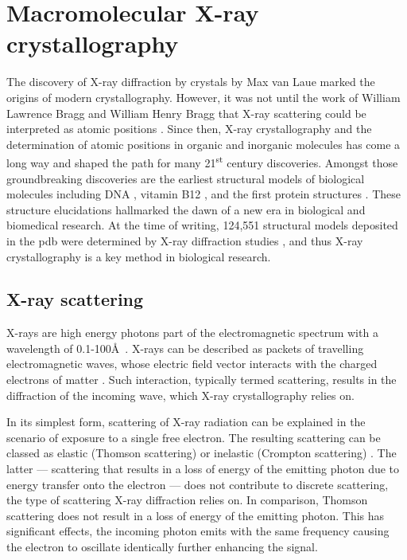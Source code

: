 
%
%

\section{Macromolecular X-ray crystallography}
The discovery of X-ray diffraction by crystals by Max van Laue \cite{Friedrich1913-vx,Laue1913-sn} marked the origins of modern crystallography. However, it was not until the work of William Lawrence Bragg and William Henry Bragg that X-ray scattering could be interpreted as atomic positions \cite{Bragg1913-cx,Bragg1929-xp,Bragg1912-ht}. Since then, X-ray crystallography and the determination of atomic positions in organic and inorganic molecules has come a long way and shaped the path for many 21\textsuperscript{st} century discoveries. Amongst those groundbreaking discoveries are the earliest structural models of biological molecules including DNA \cite{Watson1953-qw}, vitamin B12 \cite{Hodgkin1956-mx}, and the first protein structures \cite{Blundell1971-mv,Blake1965-ng,Perutz1960-qz,Kendrew1958-on}. These structure elucidations hallmarked the dawn of a new era in biological and biomedical research. At the time of writing, 124,551 structural models deposited in the \gls{pdb} were determined by X-ray diffraction studies \cite{Berman2000-ua}, and thus X-ray crystallography is a key method in biological research.

\subsection{X-ray scattering}
X-rays are high energy photons part of the electromagnetic spectrum with a wavelength of 0.1-100\AA\ \cite{Rupp2010-nc}. X-rays can be described as packets of travelling electromagnetic waves, whose electric field vector interacts with the charged electrons of matter \cite{Rupp2010-nc}. Such interaction, typically termed scattering, results in the diffraction of the incoming wave, which X-ray crystallography relies on.

In its simplest form, scattering of X-ray radiation can be explained in the scenario of exposure to a single free electron. The resulting scattering can be classed as elastic (Thomson scattering) or inelastic (Crompton scattering) \cite{Rupp2010-nc}. The latter --- scattering that results in a loss of energy of the emitting photon due to energy transfer onto the electron --- does not contribute to discrete scattering, the type of scattering X-ray diffraction relies on. In comparison, Thomson scattering does not result in a loss of energy of the emitting photon. This has significant effects, the incoming photon emits with the same frequency causing the electron to oscillate identically further enhancing the signal.

